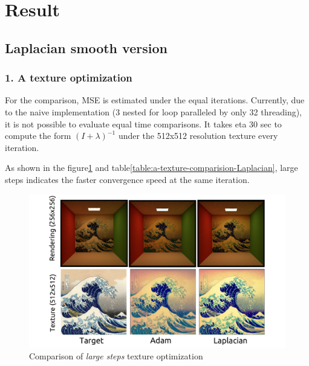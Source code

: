 \section*{Result}\label{ch:ch4label}

\subsection*{Laplacian smooth version}
\subsubsection{1. A texture optimization}

For the comparison, MSE is estimated under the equal iterations.
Currently, due to the naive implementation (3 nested for loop paralleled by only 32 threading), it is not possible to evaluate equal time comparisons. It takes eta 30 sec to compute the form $(I+\lambda)^{-1}$ under the 512x512 resolution texture every iteration. 

As shown in the figure\ref{fig:a-texture-comparision-Laplacian} and table\ref{table:a-texture-comparision-Laplacian}, large steps indicates the faster convergence speed at the same iteration.

\begin{figure}[!h]
    \includegraphics[width=\textwidth]{figures/result-1.png}
    \caption{Comparison of \emph{large steps} texture optimization}
    \label{fig:a-texture-comparision-Laplacian}
\end{figure}

\begin{table}[!h]
	\centering
	\caption{Comparison of \emph{large steps} texture optimization}
	\label{table:a-texture-comparision-Laplacian}
\end{table}

